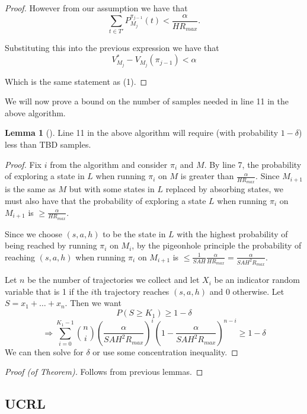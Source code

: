 \documentclass[12pt, letterpaper]{article}
\theoremstyle{definition}
\newtheorem*{lemma}{Lemma}
\theoremstyle{remark}
\begin{document}
\begin{proof}[Proof]
    However from our assumption we have that 
    \[\sum_{t \in T'} P_{M_j}^{\pi_{j-1}}(t) < \frac{\alpha}{H R_{max}}.\]

    Substituting this into the previous expression we have that
    \[V^*_{M_j} - V_{M_j}(\pi_{j-1}) < \alpha\]
    
    Which is the same statement as (1).
\end{proof}

We will now prove a bound on the number of samples needed in line 11 in the above algorithm.

\begin{lemma}[]
    Line 11 in the above algorithm will require (with probability \(1-\delta\)) less than TBD samples.
\end{lemma}

\begin{proof}[Proof]
    Fix \(i\) from the algorithm and consider \(\pi_i\) and \(M\). By line 7, the probability of exploring a state in \(L\) when running \(\pi_i\) on \(M\) is greater than \(\frac{\alpha}{HR_{max}}\). Since \(M_{i+1}\) is the same as \(M\) but with some states in \(L\) replaced by absorbing states, we must also have that the probability of exploring a state \(L\) when running \(\pi_i\) on \(M_{i+1}\) is \(\geq \frac{\alpha}{HR_{max}}\).

    Since we choose \((s, a, h)\) to be the state in \(L\) with the highest probability of being reached by running \(\pi_i\) on \(M_i\), by the pigeonhole principle the probability of reaching \((s, a, h)\) when running \(\pi_i\) on \(M_{i+1}\) is \(\leq \frac{1}{SAH} \frac{\alpha}{HR_{max}} = \frac{\alpha}{SAH^2 R_{max}}\).

    Let \(n\) be the number of trajectories we collect and let \(X_i\) be an indicator random variable that is 1 if the \(i\)th trajectory reaches \((s, a, h)\) and 0 otherwise. Let \(S = x_1 + \ldots + x_n\). Then we want
    \[P(S \geq K_1) \geq 1 - \delta\]
    \[\Rightarrow \sum_{i=0}^{K_1-1} {n \choose i} (\frac{\alpha}{SAH^2 R_{max}})^{i} (1 - \frac{\alpha}{SAH^{2} R_{max}})^{n-i} \geq 1-\delta\]
    We can then solve for \(\delta\) or use some concentration inequality.


\end{proof}


\begin{proof}[Proof (of Theorem)]
    Follows from previous lemmas.
\end{proof}

\subsection{UCRL}
\end{document}
